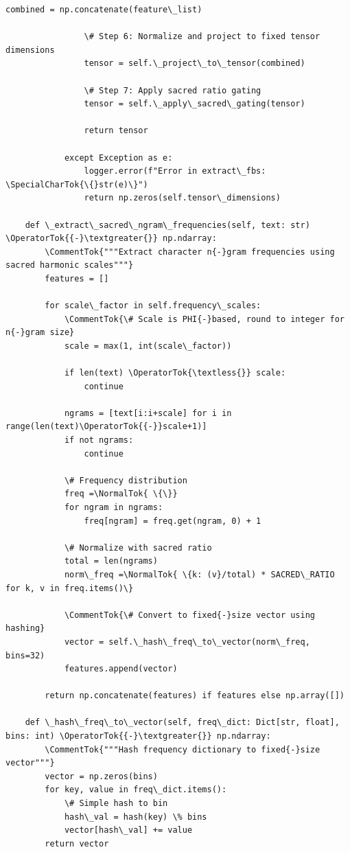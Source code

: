 \documentclass[12pt]{article}
\begin{document}
\begin{lstlisting}[basicstyle=\ttfamily\small]
                combined = np.concatenate(feature\_list)
                
                \# Step 6: Normalize and project to fixed tensor dimensions
                tensor = self.\_project\_to\_tensor(combined)
                
                \# Step 7: Apply sacred ratio gating
                tensor = self.\_apply\_sacred\_gating(tensor)
                
                return tensor
                
            except Exception as e:
                logger.error(f"Error in extract\_fbs: \SpecialCharTok{\{}str(e)\}")
                return np.zeros(self.tensor\_dimensions)
    
    def \_extract\_sacred\_ngram\_frequencies(self, text: str) \OperatorTok{{-}\textgreater{}} np.ndarray:
        \CommentTok{"""Extract character n{-}gram frequencies using sacred harmonic scales"""}
        features = []
        
        for scale\_factor in self.frequency\_scales:
            \CommentTok{\# Scale is PHI{-}based, round to integer for n{-}gram size}
            scale = max(1, int(scale\_factor))
            
            if len(text) \OperatorTok{\textless{}} scale:
                continue
                
            ngrams = [text[i:i+scale] for i in range(len(text)\OperatorTok{{-}}scale+1)]
            if not ngrams:
                continue
            
            \# Frequency distribution
            freq =\NormalTok{ \{\}}
            for ngram in ngrams:
                freq[ngram] = freq.get(ngram, 0) + 1
            
            \# Normalize with sacred ratio
            total = len(ngrams)
            norm\_freq =\NormalTok{ \{k: (v}/total) * SACRED\_RATIO for k, v in freq.items()\}
            
            \CommentTok{\# Convert to fixed{-}size vector using hashing}
            vector = self.\_hash\_freq\_to\_vector(norm\_freq, bins=32)
            features.append(vector)
        
        return np.concatenate(features) if features else np.array([])
    
    def \_hash\_freq\_to\_vector(self, freq\_dict: Dict[str, float], bins: int) \OperatorTok{{-}\textgreater{}} np.ndarray:
        \CommentTok{"""Hash frequency dictionary to fixed{-}size vector"""}
        vector = np.zeros(bins)
        for key, value in freq\_dict.items():
            \# Simple hash to bin
            hash\_val = hash(key) \% bins
            vector[hash\_val] += value
        return vector
    

\end{lstlisting}
\end{document}
